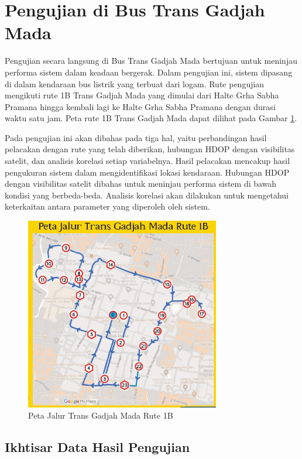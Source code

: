 \section{Pengujian di Bus Trans Gadjah Mada}
Pengujian secara langsung di Bus Trans Gadjah Mada bertujuan untuk meninjau performa sistem dalam keadaan bergerak. Dalam pengujian ini, sistem dipasang di dalam kendaraan bus listrik yang terbuat dari logam. Rute pengujian mengikuti rute 1B Trans Gadjah Mada yang dimulai dari Halte Grha Sabha Pramana hingga kembali lagi ke Halte Grha Sabha Pramana dengan durasi waktu satu jam. Peta rute 1B Trans Gadjah Mada dapat dilihat pada Gambar \ref{Fig: peta-1b}.

Pada pengujian ini akan dibahas pada tiga hal, yaitu perbandingan hasil pelacakan dengan rute yang telah diberikan, hubungan HDOP dengan visibilitas satelit, dan analisis korelasi setiap variabelnya. Hasil pelacakan mencakup hasil pengukuran sistem dalam mengidentifikasi lokasi kendaraan. Hubungan HDOP dengan visibilitas satelit dibahas untuk meninjau performa sistem di bawah kondisi yang berbeda-beda. Analisis korelasi akan dilakukan untuk mengetahui keterkaitan antara parameter yang diperoleh oleh sistem.

\begin{figure}[H]
	\centering
	\includegraphics[width=8.5cm]{contents/chapter-4/pengujian-bergerak/Peta-Jalur-Rute-1B.jpg}
	\caption{Peta Jalur Trans Gadjah Mada Rute 1B}
	\label{Fig: peta-1b}
\end{figure}

\subsection{Ikhtisar Data Hasil Pengujian}

